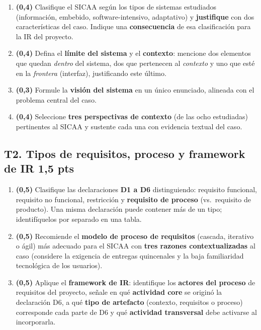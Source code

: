 \documentclass[11pt]{article}
\newcommand{\pts}[1]{\hfill{\normalsize\textbf{\textcolor{utegreendk}{#1 pts}}}}
\begin{document}
\begin{enumerate}[label=\textbf{T1.\arabic*},leftmargin=26pt,itemsep=3pt]
  \item \textbf{(0{,}4)} Clasifique el SICAA según los tipos de sistemas estudiados (información, embebido, software-intensivo, adaptativo) y \textbf{justifique} con dos características del caso. Indique una \textbf{consecuencia} de esa clasificación para la IR del proyecto.
  \item \textbf{(0{,}4)} Defina el \textbf{límite del sistema} y el \textbf{contexto}: mencione dos elementos que quedan \emph{dentro} del sistema, dos que pertenecen al \emph{contexto} y uno que esté en la \emph{frontera} (interfaz), justificando este último.
  \item \textbf{(0{,}3)} Formule la \textbf{visión del sistema} en un único enunciado, alineada con el problema central del caso.
  \item \textbf{(0{,}4)} Seleccione \textbf{tres perspectivas de contexto} (de las ocho estudiadas) pertinentes al SICAA y sustente cada una con evidencia textual del caso.
\end{enumerate}

\subsection*{T2. Tipos de requisitos, proceso y framework de IR \pts{1{,}5}}

\begin{enumerate}[label=\textbf{T2.\arabic*},leftmargin=26pt,itemsep=3pt]
  \item \textbf{(0{,}5)} Clasifique las declaraciones \textbf{D1 a D6} distinguiendo: requisito funcional, requisito no funcional, restricción y \textbf{requisito de proceso} (vs.\ requisito de producto). Una misma declaración puede contener más de un tipo; identifíquelos por separado en una tabla.
  \item \textbf{(0{,}5)} Recomiende el \textbf{modelo de proceso de requisitos} (cascada, iterativo o ágil) más adecuado para el SICAA con \textbf{tres razones contextualizadas} al caso (considere la exigencia de entregas quincenales y la baja familiaridad tecnológica de los usuarios).
  \item \textbf{(0{,}5)} Aplique el \textbf{framework de IR}: identifique los \textbf{actores del proceso} de requisitos del proyecto, señale en qué \textbf{actividad core} se originó la declaración D6, a qué \textbf{tipo de artefacto} (contexto, requisitos o proceso) corresponde cada parte de D6 y qué \textbf{actividad transversal} debe activarse al incorporarla.
\end{enumerate}
\end{document}
